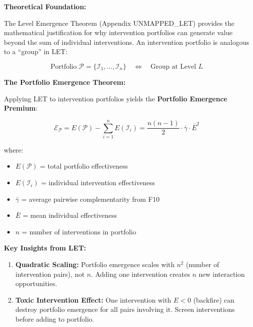 \begin{tcolorbox}[colback=orange!5!white, colframe=orange!75!black,
    title=Integration: HHH $\leftrightarrow$ FORMAL-LET (IV)]

\textbf{Theoretical Foundation:}

The Level Emergence Theorem (Appendix UNMAPPED_LET) provides the mathematical justification
for why intervention portfolios can generate value beyond the sum of individual
interventions. An intervention portfolio is analogous to a ``group'' in LET:

\begin{equation}
\text{Portfolio } \mathcal{P} = \{\mathcal{I}_1, \ldots, \mathcal{I}_n\} \quad \Longleftrightarrow \quad \text{Group at Level } L
\end{equation}

\textbf{The Portfolio Emergence Theorem:}

Applying LET to intervention portfolios yields the \textbf{Portfolio Emergence Premium}:

\begin{equation}
\boxed{\mathcal{E}_{\mathcal{P}} = E(\mathcal{P}) - \sum_{i=1}^{n} E(\mathcal{I}_i) = \frac{n(n-1)}{2} \cdot \bar{\gamma} \cdot \bar{E}^2}
\end{equation}

where:
\begin{itemize}[nosep]
\item $E(\mathcal{P})$ = total portfolio effectiveness
\item $E(\mathcal{I}_i)$ = individual intervention effectiveness
\item $\bar{\gamma}$ = average pairwise complementarity from F10
\item $\bar{E}$ = mean individual effectiveness
\item $n$ = number of interventions in portfolio
\end{itemize}

\textbf{Key Insights from LET:}

\begin{enumerate}[nosep]
\item \textbf{Quadratic Scaling:} Portfolio emergence scales with $n^2$ (number of intervention pairs), not $n$. Adding one intervention creates $n$ new interaction opportunities.

\item \textbf{Toxic Intervention Effect:} One intervention with $E < 0$ (backfire) can destroy portfolio emergence for all pairs involving it. Screen interventions before adding to portfolio.


\end{enumerate}
\end{tcolorbox}
